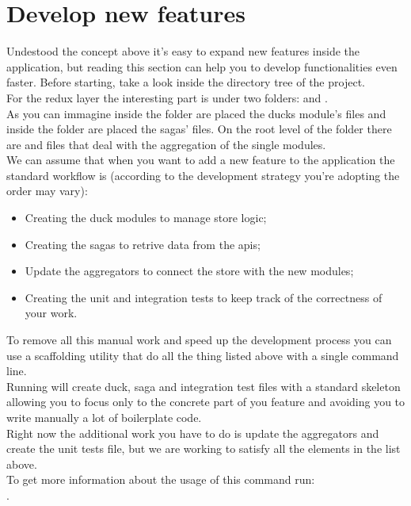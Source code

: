 \documentclass[../redux]{subfiles}
\begin{document}
	\section{Develop new features}
	Undestood the concept above it's easy to expand new features inside the application, but reading this section can help you to develop functionalities even faster.
	Before starting, take a look inside the directory tree of the project. \\
	For the redux layer the interesting part is under two folders:  and .\\
	As you can immagine inside the  folder are placed the ducks module's files and inside the  folder are placed the sagas' files. On the root level of the  folder there are  and  files that deal with the aggregation of the single modules. \\
	We can assume that when you want to add a new feature to the application the standard workflow is (according to the development strategy you're adopting the order may vary):
	\begin{itemize}
		\item Creating the duck modules to manage store logic;
		\item Creating the sagas to retrive data from the apis;
		\item Update the aggregators to connect the store with the new modules;
		\item Creating the unit and integration tests to keep track of the correctness of your work.
	\end{itemize}
	To remove all this manual work and speed up the development process you can use a scaffolding utility that do all the thing listed above with a single command line. \\
	Running  will create duck, saga and integration test files with a standard skeleton allowing you to focus only to the concrete part of you feature and avoiding you to write manually a lot of boilerplate code. \\
	Right now the additional work you have to do is update the aggregators and create the unit tests file, but we are working to satisfy all the elements in the list above. \\
	To get more information about the usage of this command run: \\ .
	
	
\end{document}

